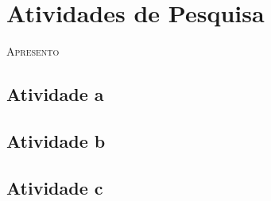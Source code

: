 \chapter{Atividades de Pesquisa}


%

\lettrine[lines=2, lhang=0.33, loversize=0.25, findent=1.5em]{A}{presento} 
\lipsum[50]


\section{Atividade a}
\lipsum[49]

\lipsum[50]

\lipsum[51]

\section{Atividade b}
\lipsum[52]

\lipsum[53]

\lipsum[54]

\section{Atividade c}

\lipsum[55]

\lipsum[56]

\lipsum[57]


